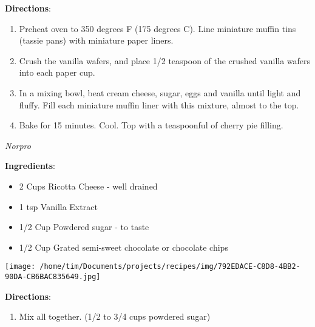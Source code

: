\documentclass[11pt, twoside, openany]{book}
\begin{document}
\textbf{Directions}:
\vspace{-3mm}\begin{enumerate}\setlength\itemsep{-1mm}
\item Preheat oven to 350 degrees F (175 degrees C). Line miniature muffin tins (tassie pans) with miniature paper liners.
\item Crush the vanilla wafers, and place 1/2 teaspoon of the crushed vanilla wafers into each paper cup.
\item In a mixing bowl, beat cream cheese, sugar, eggs and vanilla until light and fluffy. Fill each miniature muffin liner with this mixture, almost to the top.
\item Bake for 15 minutes. Cool. Top with a teaspoonful of cherry pie filling.
\end{enumerate}
 \label{cannoli-filling}\hfill\textit{Norpro}\\
\begin{minipage}[t]{0.8\linewidth}
\textbf{Ingredients}:\vspace{-3mm}
\begin{multicols}{2}
\begin{itemize}\setlength\itemsep{-1mm}
\item 2 Cups Ricotta Cheese - well drained
\item 1 tsp Vanilla Extract
\item 1/2 Cup Powdered sugar - to taste
\item 1/2 Cup Grated semi-sweet chocolate or chocolate chips
\end{itemize}
\end{multicols}
\end{minipage}
\begin{minipage}[t]{0.2\linewidth}
\centering \strut\vspace*{-\baselineskip}\newline
\texttt{[image: /home/tim/Documents/projects/recipes/img/792EDACE-C8D8-4BB2-90DA-CB6BAC835649.jpg]}\\
\end{minipage}\vspace{3mm}
\textbf{Directions}:
\vspace{-3mm}\begin{enumerate}\setlength\itemsep{-1mm}
\item Mix all together. (1/2 to 3/4 cups powdered sugar)
\end{enumerate}
 \label{leek-and-potato-soup}\hfill\textit{}\\
\end{document}
